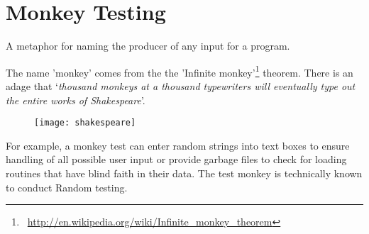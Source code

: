 \section{Monkey Testing}
\label{sec:Monkey Testing}

A metaphor for naming the producer of any input for a program.

The name 'monkey' comes from the the 'Infinite monkey'\footnote{~\url{http://en.wikipedia.org/wiki/Infinite_monkey_theorem}} theorem. There is an adage that ‘\textit{thousand monkeys at a thousand typewriters will eventually type out the entire works of Shakespeare}’.

\begin{figure}[!h]
\centering
\texttt{[image: shakespeare]}
\caption{}
\label{fig:shakespeare}
\end{figure}

For example, a monkey test can enter random strings into text boxes to ensure handling of all possible user input or provide garbage files to check for loading routines that have blind faith in their data. The test monkey is technically known to conduct Random testing.
